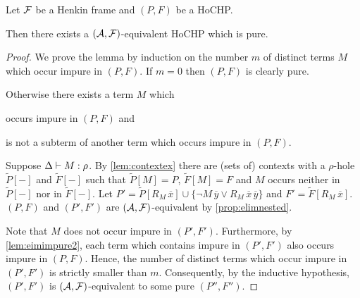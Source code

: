 \documentclass[a4paper,twoside,notitlepage,openright,11pt]{report}
\begin{document}
\begin{proposition}
  \label{lem:nfpure}
  Let $\mathcal F$ be a Henkin frame and $(P,F)$ be a HoCHP.

  Then there exists a $(\mathcal A,\mathcal F)$-equivalent HoCHP which is pure.
\end{proposition}
\begin{proof}
  We prove the lemma by induction on the number $m$ of distinct terms $M$ which occur impure in $(P,F)$. If $m=0$ then $(P,F)$ is clearly pure. 

  Otherwise there exists a term $M$ which 
  \begin{enumerate*}
  \item occurs impure in $(P,F)$ and
  \item\label{lem:eimimpure2} is not a subterm of another term which occurs impure in $(P,F)$.
  \end{enumerate*}
  Suppose $\Delta\vdash M:\rho$. By \cref{lem:contextex} there are (sets of) contexts with a $\rho$-hole $\widetilde P[-]$ and $\widetilde F[-]$ such that $\widetilde P[M]=P$, $\widetilde F[M]=F$ and $M$ occurs neither in $\widetilde P[-]$ nor in $\widetilde F[-]$. Let $P'=\widetilde P[R_M\,\overline x]\cup\{\neg M\,\overline y\lor R_M\,\overline x\,\overline y\}$ and $F'=\widetilde F[R_M\,\overline x]$. $(P,F)$ and $(P',F')$ are $(\mathcal A,\mathcal F)$-equivalent by \cref{prop:elimnested}. 

Note that $M$ does not occur impure in $(P',F')$. Furthermore, by \cref{lem:eimimpure2}, each term which contains impure in $(P',F')$ also occurs impure in $(P,F)$. Hence, the number of distinct terms which occur impure in $(P',F')$ is strictly smaller than $m$. Consequently, by the inductive hypothesis, $(P',F')$ is $(\mathcal A,\mathcal F)$-equivalent to some pure $(P'',F'')$.
\end{proof}
\end{document}
